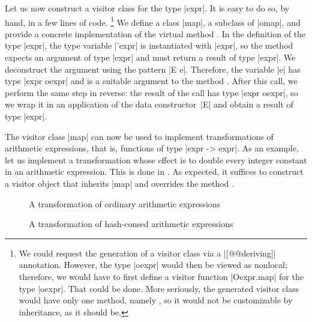 \documentclass[11pt,a4paper,twoside]{article}
\begin{document}
Let us now construct a visitor class for the type \oc|expr|. It is easy to
do so, by hand, in a few lines of code.%
%
\footnote{We could request the generation of a visitor class via a
  \oc|[@@deriving]| annotation. However, the type \oc|oexpr| would then be
  viewed as nonlocal; therefore, we would have to first define a visitor
  function \oc|Oexpr.map| for the type \oc|oexpr|. That could be done. More
  seriously, the generated visitor class would have only one method, namely
  , so it would not be customizable by inheritance, as it
  should be.}
%
We define a class \oc|map|, a subclass of \oc|omap|, and provide a concrete
implementation of the virtual method . In the definition
of the type \oc|expr|, the type variable \oc|'expr| is instantiated with
\oc|expr|, so the method  expects an argument of type
\oc|expr| and must return a result of type \oc|expr|. We deconstruct the
argument using the pattern \oc|E e|. Therefore, the variable \oc|e| has type
\oc|expr oexpr| and is a suitable argument to the method .
After this call, we perform the same step in reverse: the result of the call
has type \oc|expr oexpr|, so we wrap it in an application of the data
constructor~\oc|E| and obtain a result of type \oc|expr|.

The visitor class \oc|map| can now be used to implement transformations of
arithmetic expressions, that is, functions of type \oc|expr -> expr|. As an
example, let us implement a transformation whose effect is to double every
integer constant in an arithmetic expression. This is done in
. As expected, it suffices to construct a visitor
object that inherits \oc|map| and overrides the method
.


\begin{figure}[p]
\caption{A transformation of ordinary arithmetic expressions}
\label{fig:expr13double}
\end{figure}

\begin{figure}[p]
\caption{A transformation of hash-consed arithmetic expressions}
\label{fig:expr08double}
\end{figure}
\end{document}
